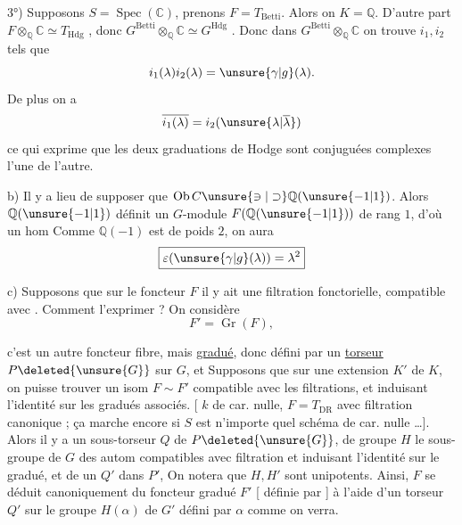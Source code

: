 3°) Supposons $S=\operatorname{Spec}(\mathbb{C})$, prenons
$F=T_{\mathrm{Betti}}$.
Alors on  $K=\mathbb{Q}$. D'autre part
$F\otimes_{\mathbb{Q}}\mathbb{C}\simeq T_{\mathrm{Hdg}}$
,
donc
$G^{\mathrm{Betti}}\otimes_{\mathbb{Q}}\mathbb{C}\simeq G^{\mathrm{Hdg}}$
.
Donc dans $G^{\mathrm{Betti}}\otimes_{\mathbb{Q}}\mathbb{C}$ on trouve
 $i_1,i_2$
tels que
\[
 i_1(\lambda)i_2(\lambda)=\unsure{\gamma|g}(\lambda).
\]
De plus on a
\[
 \overline{i_1(\lambda)}=i_2(\unsure{\lambda|\overline\lambda})
\]
ce qui exprime que les deux graduations
de Hodge sont conjuguées complexes l'une de
l'autre.

b) Il y a lieu de supposer que
$\operatorname{Ob}C\unsure{\ni|\supset}\mathbb{Q}(\unsure{-1|1})$.
Alors $\mathbb{Q}(\unsure{-1|1})$  définit
un $G$-module $F(\mathbb{Q}(\unsure{-1|1}))$ de rang $1$,
d'où un hom
Comme $\mathbb{Q}(-1)$ est de  poids $2$, on aura
\[
 \boxed{\varepsilon(\unsure{\gamma|g}(\lambda))=\lambda^2}
\]

c) Supposons que sur le foncteur $F$ il y ait
une filtration fonctorielle, compatible avec .
Comment l'exprimer ? On considère
\[
 F'=\operatorname{Gr}(F),
\]

c'est un autre foncteur fibre, mais \uline{gradué},
donc défini par un \uline{torseur} $P\deleted{\unsure{G}}$ sur $G$, et
Supposons que sur  une extension
$K'$ de $K$, on puisse trouver un isom
$F\sim F'$ compatible avec les filtrations, et
induisant l'identité sur les gradués associés.
[  $k$ de car. nulle,
$F=T_{\mathrm{DR}}$ avec filtration
canonique ; ça marche encore si $S$ est n'importe
quel schéma  de car. nulle \dots].
Alors
il y a un sous-torseur  $Q$ de $P\deleted{\unsure{G}}$, de
groupe $H$ le sous-groupe de $G$ des autom
compatibles avec filtration et induisant l'identité
sur le gradué, et de   un $Q'$ dans
$P'$, 
On notera que $H,H'$ sont unipotents. Ainsi,
$F$ se déduit canoniquement du foncteur
gradué $F'$ [ définie par
]
à l'aide d'un torseur $Q'$ sur le groupe
 $H(\alpha)$ de $G'$ défini par $\alpha$ comme on verra.

